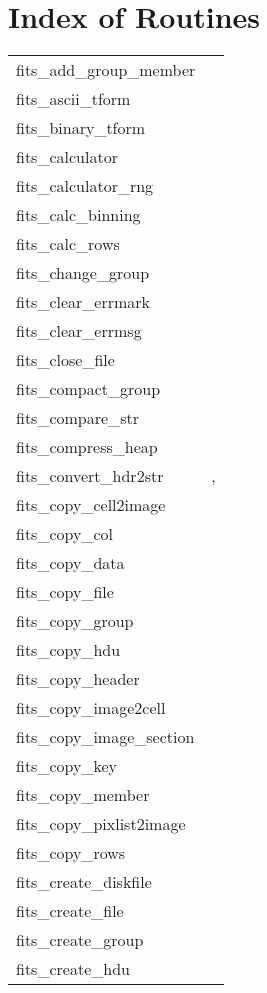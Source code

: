 \documentclass[11pt]{book}
\begin{document}
\chapter{Index of Routines }
\begin{tabular}{lr}
fits\_add\_group\_member & \pageref{ffgtam} \\
fits\_ascii\_tform    & \pageref{ffasfm} \\
fits\_binary\_tform   & \pageref{ffbnfm} \\
fits\_calculator     & \pageref{ffcalc} \\
fits\_calculator\_rng     & \pageref{ffcalcrng} \\
fits\_calc\_binning & \pageref{calcbinning} \\
fits\_calc\_rows    & \pageref{ffcrow} \\
fits\_change\_group  & \pageref{ffgtch} \\
fits\_clear\_errmark  & \pageref{ffpmrk} \\
fits\_clear\_errmsg   & \pageref{ffcmsg} \\
fits\_close\_file     & \pageref{ffclos} \\
fits\_compact\_group & \pageref{ffgtcm} \\
fits\_compare\_str    & \pageref{ffcmps} \\
fits\_compress\_heap & \pageref{ffcmph} \\
fits\_convert\_hdr2str  & \pageref{ffhdr2str}, \pageref{hdr2str} \\
fits\_copy\_cell2image & \pageref{copycell} \\
fits\_copy\_col     & \pageref{ffcpcl} \\
fits\_copy\_data      & \pageref{ffcpdt} \\
fits\_copy\_file      & \pageref{ffcpfl} \\
fits\_copy\_group    & \pageref{ffgtcp} \\
fits\_copy\_hdu       & \pageref{ffcopy} \\
fits\_copy\_header    & \pageref{ffcphd} \\
fits\_copy\_image2cell & \pageref{copycell} \\
fits\_copy\_image\_section  & \pageref{ffcpimg} \\
fits\_copy\_key           & \pageref{ffcpky} \\
fits\_copy\_member    & \pageref{ffgmcp} \\
fits\_copy\_pixlist2image & \pageref{copypixlist2image} \\
fits\_copy\_rows &   \pageref{ffcprw} \\
fits\_create\_diskfile    & \pageref{ffinit} \\
fits\_create\_file    & \pageref{ffinit} \\
fits\_create\_group  & \pageref{ffgtcr} \\
fits\_create\_hdu     & \pageref{ffcrhd} \\

\end{tabular}
\end{document}
